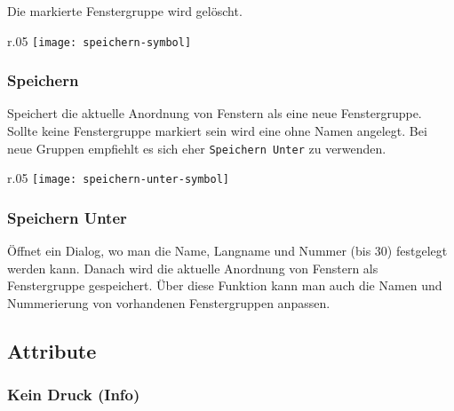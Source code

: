 \vspace{10pt}

\noindent
Die markierte Fenstergruppe wird gelöscht.\\

\begin{wrapfigure}{r}{.05\textwidth}
	\vspace{-14pt}
	\texttt{[image: speichern-symbol]}
	\vspace{-35pt}
\end{wrapfigure}

\subsubsection{Speichern}

\vspace{10pt}

Speichert die aktuelle Anordnung von Fenstern als eine neue Fenstergruppe. Sollte keine Fenstergruppe markiert sein wird eine ohne Namen angelegt. Bei neue Gruppen empfiehlt es sich eher \texttt{Speichern Unter} zu verwenden.\\

\begin{wrapfigure}{r}{.05\textwidth}
	\vspace{-14pt}
	\texttt{[image: speichern-unter-symbol]}
	\vspace{-35pt}
\end{wrapfigure}

\subsubsection{Speichern Unter}

\vspace{10pt}

Öffnet ein Dialog, wo man die Name, Langname und Nummer (bis 30) festgelegt werden kann. Danach wird die aktuelle Anordnung von Fenstern als Fenstergruppe gespeichert. Über diese Funktion kann man auch die Namen und Nummerierung von vorhandenen Fenstergruppen anpassen.\\

\subsection{Attribute}

\subsubsection{Kein Druck (Info)}

